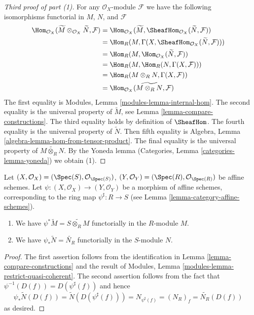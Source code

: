 \begin{proof}[Third proof of part (1)]
For any $\mathcal{O}_X$-module $\mathcal{F}$
we have the following isomorphisms functorial in $M$, $N$, and $\mathcal{F}$
\begin{align*}
\Hom_{\mathcal{O}_X}(\widetilde{M} \otimes _{\mathcal{O} _X} \widetilde{N},
\mathcal{F})
& =
\Hom_{\mathcal{O}_X}(\widetilde{M},
\SheafHom_{\mathcal{O} _X} (\widetilde{N}, \mathcal{F})) \\
& =
\Hom_R(M, \Gamma(X,
\SheafHom_{\mathcal{O}_X}(\widetilde{N}, \mathcal{F}))) \\
& =
\Hom_R(M, \Hom_{\mathcal{O}_X}(\widetilde{N}, \mathcal{F})) \\
& =
\Hom_R(M, \Hom_R(N, \Gamma(X,\mathcal{F}))) \\
& =
\Hom_R(M \otimes_R N, \Gamma(X, \mathcal{F})) \\
& =
\Hom_{\mathcal{O}_X}(\widetilde{M \otimes_R N}, \mathcal{F})
\end{align*}
The first equality is Modules, Lemma \ref{modules-lemma-internal-hom}.
The second equality is the universal property of $\widetilde{M}$, see
Lemma \ref{lemma-compare-constructions}. The third equality holds by
definition of $\SheafHom$. The fourth equality is the universal property
of $\widetilde{N}$. Then fifth equality is
Algebra, Lemma \ref{algebra-lemma-hom-from-tensor-product}.
The final equality is the universal property of
$\widetilde{M \otimes_R N}$.
By the Yoneda lemma (Categories, Lemma \ref{categories-lemma-yoneda})
we obtain (1).
\end{proof}

\begin{lemma}
\label{lemma-widetilde-pullback}
Let
$(X, \mathcal{O}_X) = (\Spec(S), \mathcal{O}_{\Spec(S)})$,
$(Y, \mathcal{O}_Y) = (\Spec(R), \mathcal{O}_{\Spec(R)})$
be affine schemes.
Let $\psi : (X, \mathcal{O}_X) \to (Y, \mathcal{O}_Y)$ be a
morphism of affine schemes, corresponding to the ring map
$\psi^\sharp : R \to S$ (see Lemma \ref{lemma-category-affine-schemes}).
\begin{enumerate}
\item We have $\psi^* \widetilde M = \widetilde{S \otimes_R M}$
functorially in the $R$-module $M$.
\item We have $\psi_* \widetilde N = \widetilde{N_R}$ functorially
in the $S$-module $N$.
\end{enumerate}
\end{lemma}

\begin{proof}
The first assertion follows from the identification in
Lemma \ref{lemma-compare-constructions}
and the result of Modules, Lemma \ref{modules-lemma-restrict-quasi-coherent}.
The second assertion follows from the fact
that $\psi^{-1}(D(f)) = D(\psi^\sharp(f))$ and hence
$$
\psi_* \widetilde N(D(f)) = \widetilde N(D(\psi^\sharp(f))) =
N_{\psi^\sharp(f)} = (N_R)_f = \widetilde{N_R}(D(f))
$$
as desired.
\end{proof}

